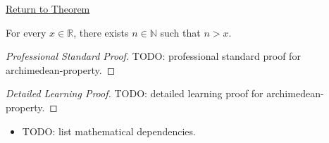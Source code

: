 \newpage
{}
\label{prf:archimedean-property}

\begin{remark*}[Return]
\hyperref[thm:archimedean-property]{Return to Theorem}
\end{remark*}

\begin{theorem*}
For every $x \in \mathbb{R}$, there exists $n \in \mathbb{N}$ such that $n > x$.
\end{theorem*}

\begin{proof}[Professional Standard Proof]
\LRAProofBodyStart
TODO: professional standard proof for archimedean-property.
\end{proof}

\begin{proof}[Detailed Learning Proof]
\LRAProofBodyStart
TODO: detailed learning proof for archimedean-property.
\end{proof}

\begin{remark*}
\end{remark*}

\begin{dependencies}
\begin{itemize}
  \item TODO: list mathematical dependencies.
\end{itemize}
\end{dependencies}

\clearpage
